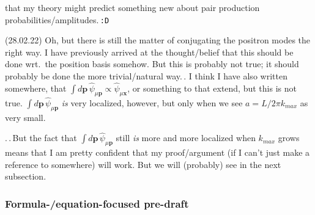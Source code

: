 \documentclass{report}
\begin{document}
that my theory might predict something new about pair production probabilities/amplitudes.\,\texttt{:D}


(28.02.22) Oh, but there is still the matter of conjugating the positron modes the right way. I have previously arrived at the thought/belief that this should be done wrt.\ the position basis somehow. But this is probably not true; it should probably be done the more trivial/natural way.\,. I think I have also written somewhere, that $\int d\boldsymbol{p}\, \hat \psi_{\mu \boldsymbol{p}} \propto \hat \psi_{\mu \boldsymbol x}$, or something to that extend, but this is not true. $\int d\boldsymbol{p}\, \hat \psi_{\mu \boldsymbol{p}}$ \emph{is} very localized, however, but only when we see $a= L/2\pi k_{max}$ as very small.

.\,.\,But the fact that $\int d\boldsymbol{p}\, \hat \psi_{\mu \boldsymbol{p}}$ still \emph{is} more and more localized when $k_{max}$ grows means that I am pretty confident that my proof/argument (if I can't just make a reference to somewhere) will work. But we will (probably) see in the next subsection.




\subsubsection{Formula-/equation-focused pre-draft}
\end{document}
